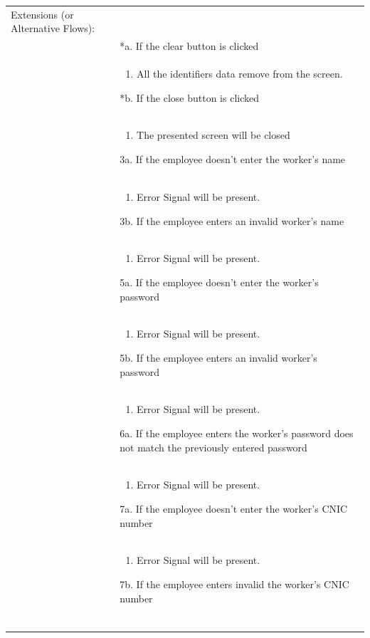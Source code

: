 \documentclass[12pt,a4paper]{article}
\begin{document}
\begin{longtable}{| p{3cm}|p{12cm}|}
Extensions (or Alternative Flows):\\
& *a. If the clear button is clicked \\
& \begin{enumerate}
		\item All the identifiers data remove from the screen.
	\end{enumerate}
*b. If the close button is clicked\\
&	\begin{enumerate}
		\item The presented screen will be closed
	\end{enumerate}
3a. If the employee doesn't enter the worker's name \\ 	
&	\begin{enumerate}
		\item Error Signal will be present.
	\end{enumerate}
3b. If the employee enters an invalid worker's name \\ 	
&	\begin{enumerate}
		\item Error Signal will be present.
	\end{enumerate}
5a. If the employee doesn't enter the worker's password \\ 	
&	\begin{enumerate}
		\item Error Signal will be present.
	\end{enumerate}
5b. If the employee enters an invalid worker's password \\ 	
&	\begin{enumerate}
		\item Error Signal will be present.
	\end{enumerate}
6a. If the employee enters the worker's password does not match the previously entered password \\ 	
&	\begin{enumerate}
		\item Error Signal will be present.
	\end{enumerate}
7a. If the employee doesn't enter the worker's CNIC number\\ 	
&	\begin{enumerate}
		\item Error Signal will be present.
	\end{enumerate}
7b. If the employee enters invalid the worker's CNIC number\\ 	
&	\begin{enumerate}

\end{enumerate}
\end{longtable}
\end{document}
